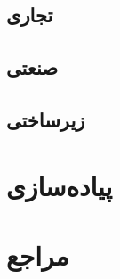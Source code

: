 \documentclass[a4paper, margin=1in]{article}
\begin{document}
\subsection{تجاری}

\subsection{صنعتی}

\subsection{زیرساختی}

\section{پیاده‌سازی}

\nocite{wp:iot}
\newpage
\section*{مراجع}
\begin{latin}
    \printbibliography[heading=none] %
\end{latin}
\end{document}
